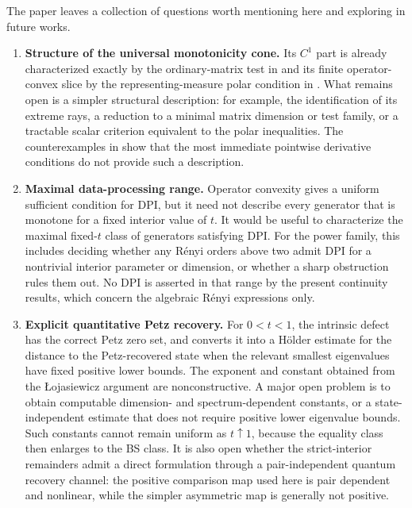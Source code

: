 \documentclass[11pt]{article}
\theoremstyle{remark}
\newcommand{\1}{\mathbbm{1}}
\begin{document}
The paper leaves a collection of questions worth mentioning here and exploring in future works.

\begin{enumerate}[label=\textbf{\arabic*.},leftmargin=*]

\item \textbf{Structure of the universal monotonicity cone.}
Its $C^1$ part is already characterized exactly by the ordinary-matrix
test in  and its
finite operator-convex slice by the representing-measure polar condition in
.  What remains
open is a simpler structural description: for example, the
identification of its extreme rays, a reduction to a minimal matrix
dimension or test family, or a tractable scalar criterion equivalent
to the polar inequalities.  The counterexamples in
show that the most immediate pointwise derivative conditions do not
provide such a description.

\item \textbf{Maximal data-processing range.}
Operator convexity gives a uniform sufficient condition for DPI, but
it need not describe every generator that is monotone for a fixed
interior value of $t$.  It would be useful to characterize the maximal
fixed-$t$ class of generators satisfying DPI.  For the power family,
this includes deciding whether any R\'enyi orders above two admit DPI
for a nontrivial interior parameter or dimension, or whether a sharp
obstruction rules them out.  No DPI is asserted in that range by the
present continuity results, which concern the algebraic R\'enyi
expressions only.

\item \textbf{Explicit quantitative Petz recovery.}
For $0<t<1$, the intrinsic defect has the correct Petz zero set, and
 converts it into a
H\"older estimate for the distance to the Petz-recovered state when
the relevant smallest eigenvalues have fixed positive lower bounds.
The exponent and constant obtained from the \L{}ojasiewicz argument
are nonconstructive.  A major open problem is to obtain computable
dimension- and spectrum-dependent constants, or a state-independent
estimate that does not require positive lower eigenvalue bounds.  Such
constants cannot remain uniform as $t\uparrow1$, because the equality
class then enlarges to the BS class.  It is also open whether the
strict-interior remainders admit a direct formulation through a
pair-independent quantum recovery channel: the positive comparison
map used here is pair dependent and nonlinear, while the simpler
asymmetric map is generally not positive.


\end{enumerate}
\end{document}
